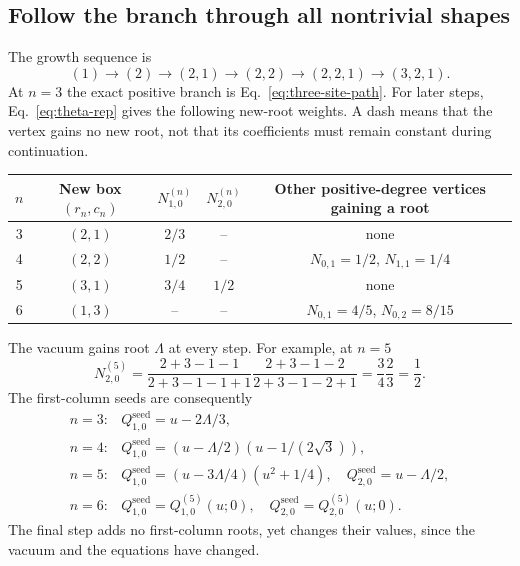 \documentclass[11pt]{article}
\begin{document}
\subsection{Follow the branch through all nontrivial shapes}

The growth sequence is
\[
 (1)\to(2)\to(2,1)\to(2,2)\to(2,2,1)\to(3,2,1).
\]
At $n=3$ the exact positive branch is Eq.~\eqref{eq:three-site-path}.
For later steps, Eq.~\eqref{eq:theta-rep} gives the following new-root
weights. A dash means that the vertex gains no new root, not that its
coefficients must remain constant during continuation.
\begin{center}
\begin{tabular}{@{}ccccc@{}}
\toprule
$n$ & New box $(r_n,c_n)$ & $N_{1,0}^{(n)}$ & $N_{2,0}^{(n)}$
 & Other positive-degree vertices gaining a root\\
\midrule
3 & $(2,1)$ & $2/3$ & -- & none\\
4 & $(2,2)$ & $1/2$ & -- & $N_{0,1}=1/2$, $N_{1,1}=1/4$\\
5 & $(3,1)$ & $3/4$ & $1/2$ & none\\
6 & $(1,3)$ & -- & -- & $N_{0,1}=4/5$, $N_{0,2}=8/15$\\
\bottomrule
\end{tabular}
\end{center}
The vacuum gains root $\Lambda$ at every step. For example, at $n=5$
\[
 N_{2,0}^{(5)}=\frac{2+3-1-1}{2+3-1-1+1}
                   \frac{2+3-1-2}{2+3-1-2+1}
                 =\frac34\frac23=\frac12.
\]
The first-column seeds are consequently
\[
\begin{array}{ll}
 n=3:&Q_{1,0}^{\mathrm{seed}}=u-2\Lambda/3,\\
 n=4:&Q_{1,0}^{\mathrm{seed}}=(u-\Lambda/2)(u-1/(2\sqrt3)),\\
 n=5:&Q_{1,0}^{\mathrm{seed}}=(u-3\Lambda/4)(u^2+1/4),\quad
       Q_{2,0}^{\mathrm{seed}}=u-\Lambda/2,\\
 n=6:&Q_{1,0}^{\mathrm{seed}}=Q_{1,0}^{(5)}(u;0),\quad
       Q_{2,0}^{\mathrm{seed}}=Q_{2,0}^{(5)}(u;0).
\end{array}
\]
The final step adds no first-column roots, yet changes their values,
since the vacuum and the equations have changed.
\end{document}
